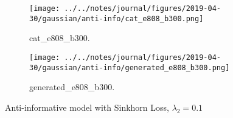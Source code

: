 \begin{figure}[!htbp]
   \centering
\begin{subfigure}[t]{0.48\textwidth}
   \texttt{[image: ../../notes/journal/figures/2019-04-30/gaussian/anti-info/cat\_e808\_b300.png]}
   \caption{cat_e808_b300.}
   \label{fig:.._.._notes_journal_figures_2019-04-30_gaussian_anti-info-a}
\end{subfigure}
\begin{subfigure}[t]{0.48\textwidth}
   \texttt{[image: ../../notes/journal/figures/2019-04-30/gaussian/anti-info/generated\_e808\_b300.png]}
   \caption{generated_e808_b300.}
   \label{fig:.._.._notes_journal_figures_2019-04-30_gaussian_anti-info-b}
\end{subfigure}
   \caption{Anti-informative model with Sinkhorn Loss, $\lambda_2 = 0.1$}
   \label{fig:.._.._notes_journal_figures_2019-04-30_gaussian_anti-info}
\end{figure}